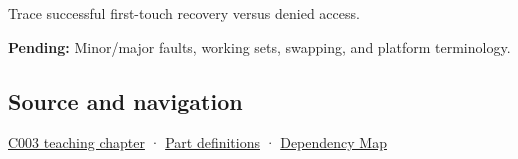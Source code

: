 Trace successful first-touch recovery versus denied access.

\textbf{Pending:} Minor/major faults, working sets, swapping, and platform terminology.

\subsection{Source and navigation}\label{appendix-cc0909a7ef14-source-and-navigation}

\hyperref[01-foundations-i-ch002-where-the-bytes-live]{C003 teaching chapter} · \hyperref[appendix-fd090d982a15-m003---parts-41-60]{Part definitions} · \hyperref[appendix-4ad47bdd269a]{Dependency Map}
